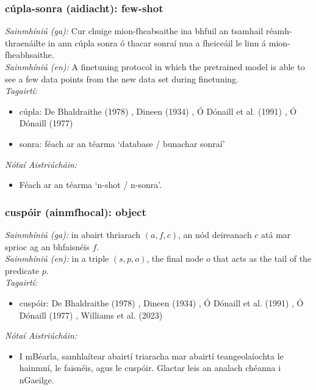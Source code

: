 \subsubsection*{cúpla-sonra (aidiacht): few-shot}
 \noindent \textit{Sainmhíniú (ga):} Cur chuige mion-fheabsaithe ina bhfuil an tsamhail réamh-thraenáilte in ann cúpla sonra ó thacar sonraí nua a fheiceáil le linn á mion-fheabhsaithe.
\\
 \noindent \textit{Sainmhíniú (en):} A finetuning protocol in which the pretrained model is able to see a few data points from the new data set during finetuning.
\\
 \noindent \textit{Tagairtí:}
\begin{itemize}
	\item cúpla: De Bhaldraithe (1978) \cite{de-bhaldraithe}, Dineen (1934) \cite{dineen}, Ó Dónaill et al. (1991) \cite{focloir-beag}, Ó Dónaill (1977) \cite{odonaill}
	\item sonra: féach ar an téarma `database / bunachar sonraí'
\end{itemize}

 \noindent \textit{Nótaí Aistriúcháin:}
\begin{itemize}
	\item Féach ar an téarma `n-shot / n-sonra'.
\end{itemize}


\subsubsection*{cuspóir (ainmfhocal): object}
 \noindent \textit{Sainmhíniú (ga):} in abairt thriarach $(a,f,c)$, an nód deireanach $c$ atá mar sprioc ag an bhfaisnéis $f$.
\\
 \noindent \textit{Sainmhíniú (en):} in a triple $(s,p,o)$, the final node $o$ that acts as the tail of the predicate $p$.
\\
 \noindent \textit{Tagairtí:}
\begin{itemize}
	\item cuspóir: De Bhaldraithe (1978) \cite{de-bhaldraithe}, Dineen (1934) \cite{dineen}, Ó Dónaill et al. (1991) \cite{focloir-beag}, Ó Dónaill (1977) \cite{odonaill}, Williams et al. (2023) \cite{storchiste}
\end{itemize}

 \noindent \textit{Nótaí Aistriúcháin:}
\begin{itemize}
	\item I mBéarla, samhlaítear abairtí triaracha mar abairtí teangeolaíochta le hainmní, le faisnéis, agus le cuspóir. Glactar leis an analach chéanna i nGaeilge.
\end{itemize}


